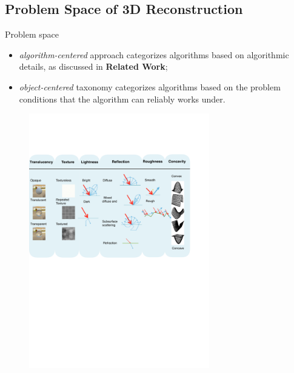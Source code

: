 \documentclass[10pt]{beamer}
\begin{document}
\subsection{Problem Space of 3D Reconstruction}
\begin{frame}{Problem space}

\begin{itemize}
\item \textit{algorithm-centered} approach categorizes algorithms based on algorithmic details, as discussed in \textbf{Related Work};
\item \textit{object-centered} taxonomy categorizes algorithms based on the problem conditions that the algorithm can reliably works under.
\end{itemize}

\begin{figure}
\includegraphics[width=0.7\textwidth]{taxo/obj_class}
\end{figure}

\end{frame}
\end{document}
